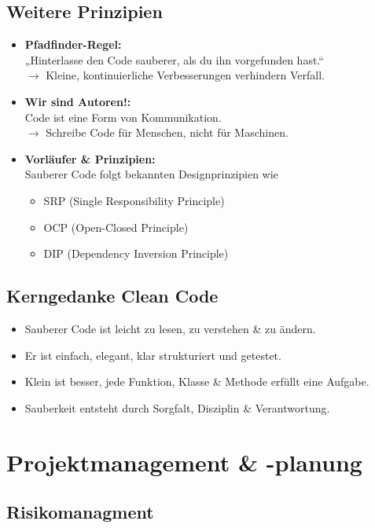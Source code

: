 \documentclass[12pt,a4paper,oneside]{article}
\begin{document}
\subsection{Weitere Prinzipien}

\begin{itemize}
\item \textbf{Pfadfinder-Regel:} \\
„Hinterlasse den Code sauberer, als du ihn vorgefunden hast.“ \\
$\rightarrow$ Kleine, kontinuierliche Verbesserungen verhindern Verfall.
\item \textbf{Wir sind Autoren!:} \\
Code ist eine Form von Kommunikation. \\
$\rightarrow$ Schreibe Code für Menschen, nicht für Maschinen.
\item \textbf{Vorläufer \& Prinzipien:} \\
Sauberer Code folgt bekannten Designprinzipien wie
\begin{itemize}
\item SRP (Single Responsibility Principle)
\item OCP (Open-Closed Principle)
\item DIP (Dependency Inversion Principle)
\end{itemize}
\end{itemize}

\subsection{Kerngedanke Clean Code}

\begin{itemize}
\item Sauberer Code ist leicht zu lesen, zu verstehen \& zu ändern.
\item Er ist einfach, elegant, klar strukturiert und getestet.
\item Klein ist besser, jede Funktion, Klasse \& Methode erfüllt eine Aufgabe.
\item Sauberkeit entsteht durch Sorgfalt, Disziplin \& Verantwortung.
\end{itemize}

\section{Projektmanagement \& -planung}

\subsection{Risikomanagment}
\end{document}
